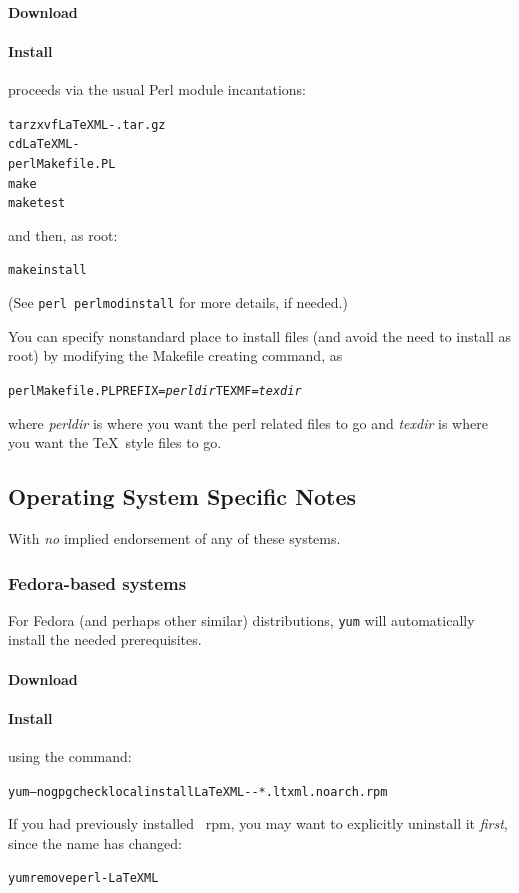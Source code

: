 \documentclass{article}
\begin{document}
\paragraph{Download} \CurrentTarball
\paragraph{Install} proceeds via the usual Perl module incantations:
\begin{alltt}
   tar zxvf LaTeXML-\CurrentVersion.tar.gz\\
   cd LaTeXML-\CurrentVersion\\
   perl Makefile.PL
   make
   make test
\end{alltt}
and then, as root:
\begin{alltt}
   make install
\end{alltt}
(See \texttt{perl perlmodinstall} for more details, if needed.)

You can specify nonstandard place to install files (and avoid the need to install as root)
by modifying the Makefile creating command, as
\begin{alltt}
   perl Makefile.PL PREFIX=\emph{perldir} TEXMF=\emph{texdir}
\end{alltt}
where \emph{perldir} is where you want the perl related files to go and
\emph{texdir} is where you want the \TeX\ style files to go.

\subsection[OS-Specific Notes]{Operating System Specific Notes}\label{install.osnotes}
With \emph{no} implied endorsement of any of these systems.

\subsubsection[Fedora-based systems]{Fedora-based systems}\label{install.fedora}
For Fedora (and perhaps other similar) distributions, \texttt{yum} will automatically install
the needed prerequisites.
\paragraph{Download} \CurrentFedora
\paragraph{Install} using the command:
\begin{alltt}
   yum --nogpgcheck localinstall LaTeXML-\CurrentVersion-*.ltxml.noarch.rpm
\end{alltt}
If you had previously installed \LaTeXML\ rpm, you may want to explicitly
uninstall it \emph{first}, since the name has changed:
\begin{alltt}
   yum remove perl-LaTeXML
\end{alltt}
\end{document}
